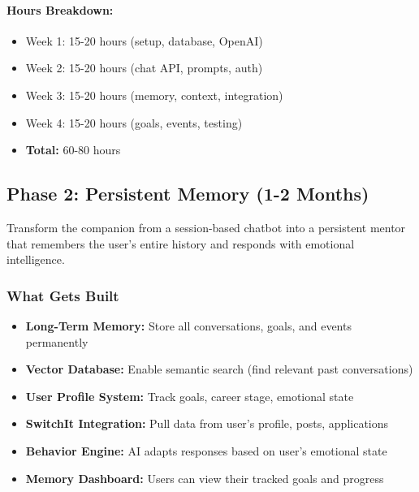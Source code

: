 \documentclass[12pt,a4paper]{article}
\begin{document}
\paragraph{Hours Breakdown:}
\begin{itemize}
    \item Week 1: 15-20 hours (setup, database, OpenAI)
    \item Week 2: 15-20 hours (chat API, prompts, auth)
    \item Week 3: 15-20 hours (memory, context, integration)
    \item Week 4: 15-20 hours (goals, events, testing)
    \item \textbf{Total:} 60-80 hours
\end{itemize}

\newpage

\subsection{Phase 2: Persistent Memory (1-2 Months)}

\begin{tcolorbox}[colback=switchitblue!5,colframe=switchitblue,title=\textbf{Phase 2 Goal}]
Transform the companion from a session-based chatbot into a persistent mentor that remembers the user's entire history and responds with emotional intelligence.
\end{tcolorbox}

\subsubsection{What Gets Built}

\begin{itemize}[leftmargin=*]
    \item \textbf{Long-Term Memory:} Store all conversations, goals, and events permanently
    \item \textbf{Vector Database:} Enable semantic search (find relevant past conversations)
    \item \textbf{User Profile System:} Track goals, career stage, emotional state
    \item \textbf{SwitchIt Integration:} Pull data from user's profile, posts, applications
    \item \textbf{Behavior Engine:} AI adapts responses based on user's emotional state
    \item \textbf{Memory Dashboard:} Users can view their tracked goals and progress
\end{itemize}
\end{document}
